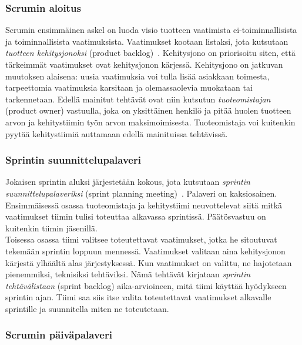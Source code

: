 \documentclass[finnish]{../tktltiki2}
\theoremstyle{definition}
\theoremstyle{remark}
\begin{document}
\subsubsection{Scrumin aloitus}

Scrumin ensimmäinen askel on luoda visio tuotteen vaatimista
ei-toiminnalli\-sista ja toiminnallisista vaatimuksista. Vaatimukset
kootaan listaksi, jota kutsutaan \emph{tuotteen kehitysjonoksi} (product backlog)~\cite{ScrumFinnishGuide}. Kehitysjono on priorisoitu siten, että tärkeimmät vaatimukset ovat kehitysjonon kärjessä. Kehitysjono on jatkuvan muutoksen alaisena: uusia vaatimuksia
voi tulla lisää asiakkaan toimesta, tarpeettomia vaatimuksia karsitaan ja olemassaolevia muokataan tai tarkennetaan. Edellä mainitut tehtävät
ovat niin kutsutun \emph{tuoteomistajan} (product owner) vastuulla,
joka on yksittäinen henkilö ja pitää huolen tuotteen arvon ja kehitystiimin työn arvon maksimoimisesta. Tuoteomistaja voi kuitenkin pyytää kehitystiimiä auttamaan edellä mainituissa tehtävissä.

\subsubsection{Sprintin suunnittelupalaveri}

Jokaisen sprintin aluksi järjestetään kokous, jota kutsutaan \emph{sprintin suunnittelupalaveriksi} (sprint planning meeting)~\cite{ScrumHandBook}. Palaveri on kaksiosainen.
Ensimmäisessä osassa tuoteomistaja ja kehitystiimi neuvottelevat
siitä mitkä vaatimukset tiimin tulisi toteuttaa alkavassa
sprintissä. Päätösvastuu on kuitenkin tiimin jäsenillä.\\

Toisessa osassa tiimi valitsee toteutettavat vaatimukset, jotka
he sitoutuvat tekemään sprintin loppuun mennessä. Vaatimukset
valitaan aina kehitysjonon kärjestä ylhäältä alas järjestyksessä.
Kun vaatimukset on valittu, ne hajotetaan pienemmiksi, teknisiksi
tehtäviksi. Nämä tehtävät kirjataan \emph{sprintin tehtävälistaan} (sprint backlog) aika-arvioineen, mitä tiimi käyttää hyödykseen sprintin ajan. Tiimi saa siis itse valita toteutettavat vaatimukset alkavalle sprintille ja suunnitella miten ne toteutetaan.

\subsubsection{Scrumin päiväpalaveri}
\end{document}

